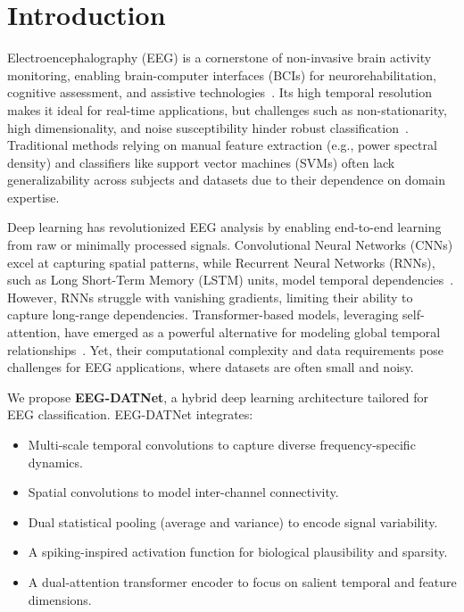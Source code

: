 \documentclass[pdflatex,sn-mathphys-num]{sn-jnl}%
\theoremstyle{thmstyleone}
\theoremstyle{thmstyletwo}
\theoremstyle{thmstylethree}
\begin{document}

\maketitle

\section{Introduction}\label{sec:introduction}

Electroencephalography (EEG) is a cornerstone of non-invasive brain activity monitoring, enabling brain-computer interfaces (BCIs) for neurorehabilitation, cognitive assessment, and assistive technologies~\cite{roy2019deep}. Its high temporal resolution makes it ideal for real-time applications, but challenges such as non-stationarity, high dimensionality, and noise susceptibility hinder robust classification~\cite{lotte2018review}. Traditional methods relying on manual feature extraction (e.g., power spectral density) and classifiers like support vector machines (SVMs) often lack generalizability across subjects and datasets due to their dependence on domain expertise.

Deep learning has revolutionized EEG analysis by enabling end-to-end learning from raw or minimally processed signals. Convolutional Neural Networks (CNNs) excel at capturing spatial patterns, while Recurrent Neural Networks (RNNs), such as Long Short-Term Memory (LSTM) units, model temporal dependencies~\cite{craik2019deep}. However, RNNs struggle with vanishing gradients, limiting their ability to capture long-range dependencies. Transformer-based models, leveraging self-attention, have emerged as a powerful alternative for modeling global temporal relationships~\cite{vafaei2025transformers, vaswani2017attention}. Yet, their computational complexity and data requirements pose challenges for EEG applications, where datasets are often small and noisy.

We propose \textbf{EEG-DATNet}, a hybrid deep learning architecture tailored for EEG classification. EEG-DATNet integrates:
\begin{itemize}
    \item Multi-scale temporal convolutions to capture diverse frequency-specific dynamics.
    \item Spatial convolutions to model inter-channel connectivity.
    \item Dual statistical pooling (average and variance) to encode signal variability.
    \item A spiking-inspired activation function for biological plausibility and sparsity.
    \item A dual-attention transformer encoder to focus on salient temporal and feature dimensions.
\end{itemize}
\end{document}
